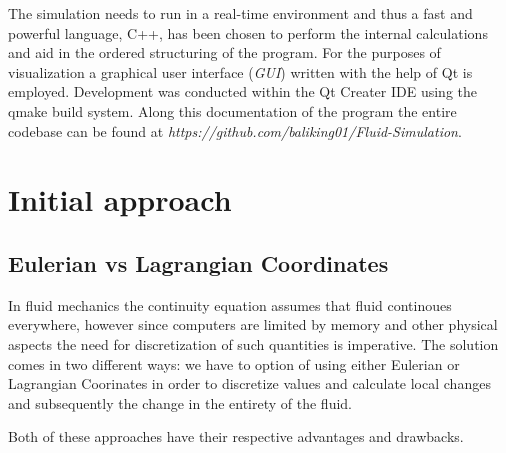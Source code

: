 \documentclass[12pt, titlepage]{article}
\begin{document}
The simulation needs to run in a real-time environment and thus a fast and powerful language, C++, has been chosen to perform the internal calculations and aid in the ordered structuring of the program. For the purposes of visualization a graphical user interface (\textit{GUI}) written with the help of Qt is employed. Development was conducted within the Qt Creater IDE using the qmake build system. Along this documentation of the program the entire codebase can be found at \textit{https://github.com/baliking01/Fluid-Simulation}.

\pagebreak

\section{Initial approach}

\subsection{Eulerian vs Lagrangian Coordinates}
In fluid mechanics the continuity equation assumes that fluid continoues everywhere, however since computers are limited by memory and other physical aspects the need for discretization of such quantities is imperative. The solution comes in two different ways: we have to option of using either Eulerian or Lagrangian Coorinates in order to discretize values and calculate local changes and subsequently the change in the entirety of the fluid.

Both of these approaches have their respective advantages and drawbacks.

\begin{figure}[b]
\centering
\begin{minipage}{.5\textwidth}
  \centering
  \label{fig:grid}
\end{minipage}%
\begin{minipage}{.5\textwidth}
  \centering
  \label{fig:particle}
\end{minipage}
\end{figure}
\end{document}
